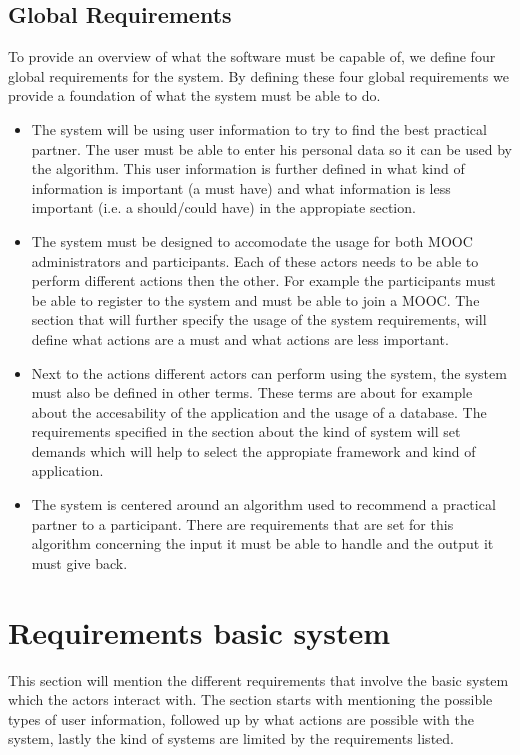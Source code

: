 \documentclass[]{article}
\begin{document}
\subsection{Global Requirements}
To provide an overview of what the software must be capable of, we define four global requirements for the system. By defining these four global requirements we provide a foundation of what the system must be able to do.
\begin{itemize}
\item The system will be using user information to try to find the best practical partner.
The user must be able to enter his personal data so it can be used by the algorithm.
This user information is further defined in what kind of information is important (a must have) and what information is less important (i.e. a should/could have) in the appropiate section.
\item The system must be designed to accomodate the usage for both MOOC administrators and participants.
Each of these actors needs to be able to perform different actions then the other.
For example the participants must be able to register to the system and must be able to join a MOOC.
The section that will further specify the usage of the system requirements, will define what actions are a must and what actions are less important.
\item Next to the actions different actors can perform using the system, the system must also be defined in other terms.
These terms are about for example about the accesability of the application and the usage of a database.
The requirements specified in the section about the kind of system will set demands which will help to select the appropiate framework and kind of application.
\item The system is centered around an algorithm used to recommend a practical partner to a participant.
There are requirements that are set for this algorithm concerning the input it must be able to handle and the output it must give back.
\end{itemize}

\section{Requirements basic system}
This section will mention the different requirements that involve the basic system which the actors interact with. The section starts with mentioning the possible types of user information, followed up by what actions are possible with the system, lastly the kind of systems are limited by the requirements listed.
\end{document}
